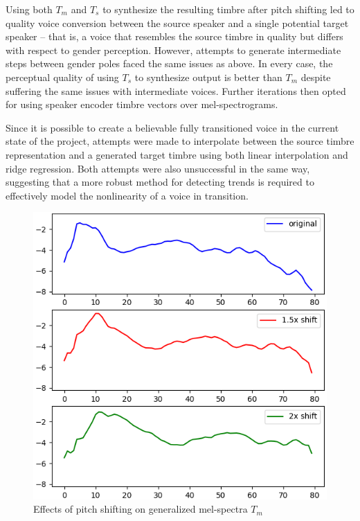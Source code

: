 \documentclass{article}
\begin{document}
Using both $T_m$ and $T_s$ to synthesize the resulting timbre after pitch shifting led to quality voice conversion between the source speaker and a single potential target speaker -- that is, a voice that resembles the source timbre in quality but differs with respect to gender perception. However, attempts to generate intermediate steps between gender poles faced the same issues as above. In every case, the perceptual quality of using $T_s$ to synthesize output is better than $T_m$ despite suffering the same issues with intermediate voices. Further iterations then opted for using speaker encoder timbre vectors over mel-spectrograms.

Since it is possible to create a believable fully transitioned voice in the current state of the project, attempts were made to interpolate between the source timbre representation and a generated target timbre using both linear interpolation and ridge regression. Both attempts were also unsuccessful in the same way, suggesting that a more robust method for detecting trends is required to effectively model the nonlinearity of a voice in transition.

\begin{figure}
    \centering
    \includegraphics[width=0.9\linewidth]{mel-shift.png}
    \caption{Effects of pitch shifting on generalized mel-spectra $T_m$}
    \label{fig:mel-shift}
\end{figure}
\end{document}

